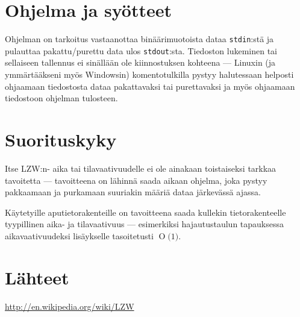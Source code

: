 \documentclass{article}
\newcommand{\BigO}[1]{\ensuremath{\operatorname{O}\bigl(#1\bigr)}}
\begin{document}
\section{Ohjelma ja syötteet}
Ohjelman on tarkoitus vastaanottaa binäärimuotoista dataa \verb=stdin=:stä ja pulauttaa pakattu/purettu data ulos \verb=stdout=:sta. Tiedoston lukeminen tai sellaiseen tallennus ei sinällään ole kiinnostuksen kohteena --- Linuxin (ja ymmärtääkseni myös Windowsin) komentotulkilla pystyy halutessaan helposti ohjaamaan tiedostosta dataa pakattavaksi tai purettavaksi ja myös ohjaamaan tiedostoon ohjelman tulosteen.

\section{Suorituskyky}
Itse LZW:n- aika tai tilavaativuudelle ei ole ainakaan toistaiseksi tarkkaa tavoitetta --- tavoitteena on lähinnä saada aikaan ohjelma, joka pystyy pakkaamaan ja purkamaan suuriakin määriä dataa järkevässä ajassa.

Käytetyille aputietorakenteille on tavoitteena saada kullekin tietorakenteelle tyypillinen aika- ja tilavaativuus --- esimerkiksi hajautustaulun tapauksessa aikavaativuudeksi lisäykselle tasoitetusti \BigO{1}.

\section{Lähteet}
\url{http://en.wikipedia.org/wiki/LZW}
\end{document}
